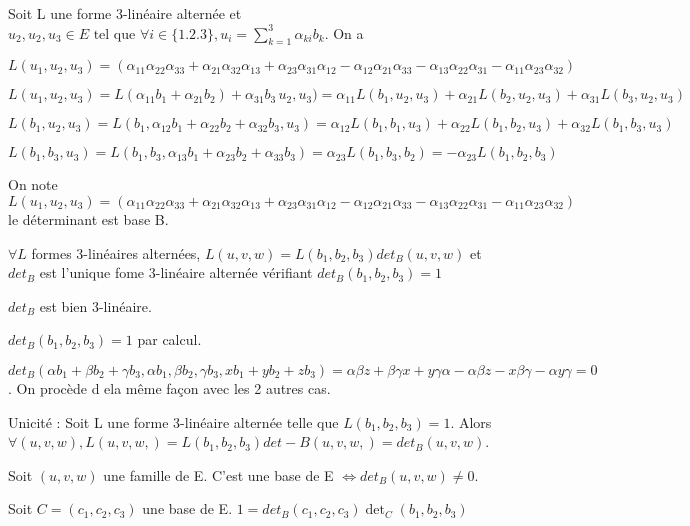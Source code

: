 \documentclass[french]{yLectureNote}
\newcommand{\tq}[0]{\text{ tel que }}
\begin{document}
\begin{proposition}
Soit L une forme 3-linéaire alternée et \(u_2,u_2,u_3\in E \tq \forall i \in \{1.2.3\}, u_i = \sum^3_{k = 1}\alpha_{ki}b_k\). On a

\(L(u_1,u_2,u_3) = (\alpha_{11}\alpha_{22}\alpha_{33}+\alpha_{21}\alpha_{32}\alpha_{13}+ \alpha_{23}\alpha_{31}\alpha_{12}-\alpha_{12}\alpha_{21}\alpha_{33}-\alpha_{13}\alpha_{22}\alpha_{31}-\alpha_{11}\alpha_{23}\alpha_{32})\)
\end{proposition}
\begin{myproof}
 \(L(u_1,u_2,u_3) = L(\alpha_{11}b_1+\alpha_{21}b_2)+\alpha_{31}b_3\,u_2,u_3) = \alpha_{11}L(b_1,u_2,u_3)+\alpha_{21}L(b_2,u_2,u_3)+\alpha_{31}L(b_3,u_2,u_3)\)

 \(L(b_1,u_2,u_3) = L(b_1, \alpha_{12}b_1+\alpha_{22}b_2+\alpha_{32}b_3,u_3) = \alpha_{12}L(b_1,b_1,u_3)+\alpha_{22}L(b_1,b_2,u_3)+\alpha_{32}L(b_1,b_3,u_3)\)

 \(L(b_1,b_3,u_3) = L(b_1,b_3,\alpha_{13}b_1+\alpha_{23}b_2+\alpha_{33}b_3) = \alpha_{23}L(b_1,b_3,b_2) = -\alpha_{23}L(b_1,b_2,b_3)\)
\end{myproof}
\begin{definition}
On note \(L(u_1,u_2,u_3) = (\alpha_{11}\alpha_{22}\alpha_{33}+\alpha_{21}\alpha_{32}\alpha_{13}+ \alpha_{23}\alpha_{31}\alpha_{12}-\alpha_{12}\alpha_{21}\alpha_{33}-\alpha_{13}\alpha_{22}\alpha_{31}-\alpha_{11}\alpha_{23}\alpha_{32})\) le déterminant est base B.
\end{definition}
\begin{proposition}
\(\forall L\) formes 3-linéaires alternées, \(L(u,v,w) = L(b_1,b_2,b_3)det_B(u,v,w)\) et \(det_B\) est l'unique fome 3-linéaire alternée vérifiant \(det_B(b_1,b_2,b_3) = 1\)
\end{proposition}
\begin{myproof}
 \(det_B\) est bien 3-linéaire.

 \(det_B(b_1,b_2,b_3) = 1\) par calcul.

 \(det_B(\alpha b_1 + \beta b_2+\gamma b_3, \alpha b_1, \beta b_2, \gamma b_3, xb_1+yb_2+zb_3) = \alpha \beta z + \beta \gamma x + y\gamma \alpha - \alpha \beta z-x\beta \gamma-\alpha y \gamma = 0\). On procède d ela m\^eme  façon avec les 2 autres cas.


 Unicité : Soit L une forme 3-linéaire alternée telle que \(L(b_1,b_2,b_3) = 1\). Alors \(\forall (u,v,w), L(u,v,w,) = L(b_1,b_2,b_3)det-B(u,v,w,) = det_B(u,v,w)\).
\end{myproof}
\begin{proposition}
Soit \((u,v,w)\) une famille de E. C'est une base de E \(\iff det_B(u,v,w) \neq 0\).

Soit \(C = (c_1,c_2,c_3)\) une base de E. \(1 = det_B(c_1,c_2,c_3)\det_C(b_1,b_2,b_3)\)
\end{proposition}
\end{document}
